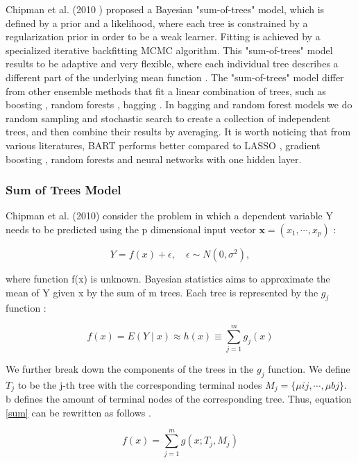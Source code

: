 \documentclass{usiinftr}
\begin{document}
 Chipman et al. (2010 )\cite{7} proposed a Bayesian "sum-of-trees" model, which is defined by a prior and a likelihood, where each tree is constrained by a regularization prior in order to be a weak learner.  Fitting is achieved by a specialized iterative backfitting MCMC algorithm. This "sum-of-trees" model results to be adaptive and very flexible, where each individual tree describes a different part of the underlying mean function \cite{7}. The "sum-of-trees" model differ from other ensemble methods that fit a linear combination of trees, such as boosting \cite{11}, random forests \cite{10}, bagging \cite{12}. In bagging and random forest models we do random sampling and stochastic search to create a collection of independent trees, and then combine their results by averaging. It is worth noticing that from various literatures, BART performs better compared to LASSO \cite{8}, gradient boosting \cite{9}, random forests \cite{10} and neural networks with one hidden layer. 
 
\subsubsection{Sum of Trees Model}
Chipman et al. (2010) consider the problem in which a dependent variable Y needs to be predicted using the p dimensional input vector $\textbf{x} = (x_1,\cdots, x_p)$ \cite{7}:

\begin{equation}
Y=f(x)+\epsilon, \quad \epsilon \sim N\left(0, \sigma^{2}\right),
\end{equation}

where function f(x) is unknown. Bayesian statistics aims to approximate the mean of Y given x by the sum of m trees. Each tree is represented by the $g_j$ function \cite{7}:

\begin{equation} \label{sum}
f(x)=E(Y \mid x) \approx h(x) \equiv \sum_{j=1}^{m} g_{j}(x)
\end{equation}

We further break down the components of the trees in the $g_j$ function. We define $T_j$ to be the j-th tree with the corresponding terminal nodes $M_j = \{ \mu{ij}, \cdots, \mu{bj} \}$. b defines the amount of terminal nodes of the corresponding tree. Thus, equation \ref{sum} can be rewritten as follows \cite{7}.

\begin{equation} \label{sum1}
f(x)= \sum_{j=1}^{m} g(x;T_j,M_j)
\end{equation}
\end{document}
